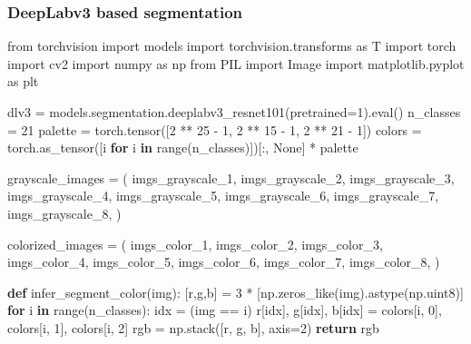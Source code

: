 \documentclass[
]{article}
\newenvironment{Shaded}{}{}
\newcommand{\BuiltInTok}[1]{#1}
\newcommand{\ControlFlowTok}[1]{\textcolor[rgb]{0.00,0.44,0.13}{\textbf{#1}}}
\newcommand{\DecValTok}[1]{\textcolor[rgb]{0.25,0.63,0.44}{#1}}
\newcommand{\ImportTok}[1]{#1}
\newcommand{\KeywordTok}[1]{\textcolor[rgb]{0.00,0.44,0.13}{\textbf{#1}}}
\newcommand{\NormalTok}[1]{#1}
\newcommand{\OperatorTok}[1]{\textcolor[rgb]{0.40,0.40,0.40}{#1}}
\newcommand{\VariableTok}[1]{\textcolor[rgb]{0.10,0.09,0.49}{#1}}
\begin{document}
\clearpage
\hypertarget{deeplabv3-based-segmentation}{%
\subsubsection{DeepLabv3 based
segmentation}\label{deeplabv3-based-segmentation}}

\begin{Shaded}
\begin{Highlighting}[]
\ImportTok{from}\NormalTok{ torchvision }\ImportTok{import}\NormalTok{ models}
\ImportTok{import}\NormalTok{ torchvision.transforms }\ImportTok{as}\NormalTok{ T}
\ImportTok{import}\NormalTok{ torch}
\ImportTok{import}\NormalTok{ cv2}
\ImportTok{import}\NormalTok{ numpy }\ImportTok{as}\NormalTok{ np}
\ImportTok{from}\NormalTok{ PIL }\ImportTok{import}\NormalTok{ Image}
\ImportTok{import}\NormalTok{ matplotlib.pyplot }\ImportTok{as}\NormalTok{ plt}

\NormalTok{dlv3 }\OperatorTok{=}\NormalTok{ models.segmentation.deeplabv3\_resnet101(pretrained}\OperatorTok{=}\DecValTok{1}\NormalTok{).}\BuiltInTok{eval}\NormalTok{()}
\NormalTok{n\_classes }\OperatorTok{=} \DecValTok{21} 
\NormalTok{palette }\OperatorTok{=}\NormalTok{ torch.tensor([}\DecValTok{2} \OperatorTok{**} \DecValTok{25} \OperatorTok{{-}} \DecValTok{1}\NormalTok{, }\DecValTok{2} \OperatorTok{**} \DecValTok{15} \OperatorTok{{-}} \DecValTok{1}\NormalTok{, }\DecValTok{2} \OperatorTok{**} \DecValTok{21} \OperatorTok{{-}} \DecValTok{1}\NormalTok{])}
\NormalTok{colors }\OperatorTok{=}\NormalTok{ torch.as\_tensor([i }\ControlFlowTok{for}\NormalTok{ i }\KeywordTok{in} \BuiltInTok{range}\NormalTok{(n\_classes)])[:, }\VariableTok{None}\NormalTok{] }\OperatorTok{*}\NormalTok{ palette}

\NormalTok{grayscale\_images }\OperatorTok{=}\NormalTok{ (}
\NormalTok{    imgs\_grayscale\_1,}
\NormalTok{    imgs\_grayscale\_2,}
\NormalTok{    imgs\_grayscale\_3,}
\NormalTok{    imgs\_grayscale\_4,}
\NormalTok{    imgs\_grayscale\_5,}
\NormalTok{    imgs\_grayscale\_6,}
\NormalTok{    imgs\_grayscale\_7,}
\NormalTok{    imgs\_grayscale\_8,}
\NormalTok{)}


\NormalTok{colorized\_images }\OperatorTok{=}\NormalTok{ (}
\NormalTok{    imgs\_color\_1,}
\NormalTok{    imgs\_color\_2,}
\NormalTok{    imgs\_color\_3,}
\NormalTok{    imgs\_color\_4,}
\NormalTok{    imgs\_color\_5,}
\NormalTok{    imgs\_color\_6,}
\NormalTok{    imgs\_color\_7,}
\NormalTok{    imgs\_color\_8,}
\NormalTok{)}

\KeywordTok{def}\NormalTok{ infer\_segment\_color(img):}
\NormalTok{  [r,g,b] }\OperatorTok{=} \DecValTok{3} \OperatorTok{*}\NormalTok{ [np.zeros\_like(img).astype(np.uint8)]}
  \ControlFlowTok{for}\NormalTok{ i }\KeywordTok{in} \BuiltInTok{range}\NormalTok{(n\_classes):}
\NormalTok{    idx }\OperatorTok{=}\NormalTok{ (img }\OperatorTok{==}\NormalTok{ i)}
\NormalTok{    r[idx],  g[idx],  b[idx] }\OperatorTok{=}\NormalTok{  colors[i, }\DecValTok{0}\NormalTok{],  colors[i, }\DecValTok{1}\NormalTok{], colors[i, }\DecValTok{2}\NormalTok{]}
\NormalTok{  rgb }\OperatorTok{=}\NormalTok{ np.stack([r, g, b], axis}\OperatorTok{=}\DecValTok{2}\NormalTok{)}
  \ControlFlowTok{return}\NormalTok{ rgb}


\end{Highlighting}
\end{Shaded}
\end{document}
